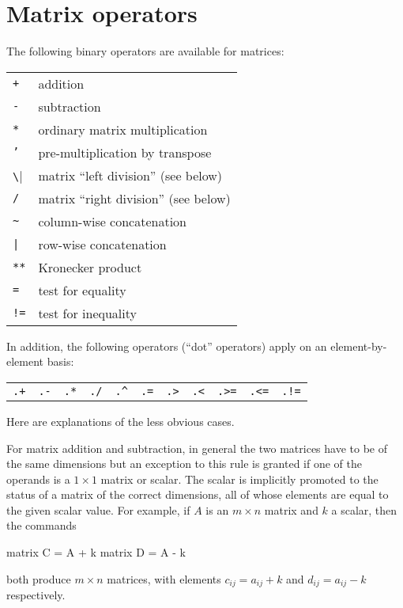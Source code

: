\section{Matrix operators}
\label{matrix-op}

The following binary operators are available for matrices:

\begin{center}
\begin{tabular}{ll}
\texttt{+}  & addition \\
\texttt{-}  & subtraction \\
\texttt{*}  & ordinary matrix multiplication \\
\texttt{'}  & pre-multiplication by transpose \\
\verb|\|    & matrix ``left division'' (see below) \\
\texttt{/}  & matrix ``right division'' (see below) \\
\verb+~+    & column-wise concatenation \\
\verb+|+    & row-wise concatenation \\
\texttt{**} & Kronecker product \\
\texttt{=}  & test for equality \\
\texttt{!=} & test for inequality
\end{tabular}
\end{center}

In addition, the following operators (``dot'' operators) apply on an
element-by-element basis:

\begin{center}
\begin{tabular}{ccccccccccc}
\texttt{.+}  &  \texttt{.-}  &
\texttt{.*}  &  \texttt{./}  &  \verb+.^+  &
\texttt{.=}  &  \texttt{.>}  &  \texttt{.<} &
\texttt{.>=}  &  \texttt{.<=} & \texttt{.!=}
\end{tabular}
\end{center}

Here are explanations of the less obvious cases. 

For matrix addition and subtraction, in general the two matrices have
to be of the same dimensions but an exception to this rule is granted
if one of the operands is a $1\times 1$ matrix or scalar.  The scalar
is implicitly promoted to the status of a matrix of the correct
dimensions, all of whose elements are equal to the given scalar value.
For example, if $A$ is an $m \times n$ matrix and $k$ a scalar, then
the commands
%
\begin{code}
matrix C = A + k
matrix D = A - k
\end{code}
%
both produce $m \times n$ matrices, with elements $c_{ij} = 
a_{ij} + k$ and $d_{ij} = a_{ij} - k$ respectively.

